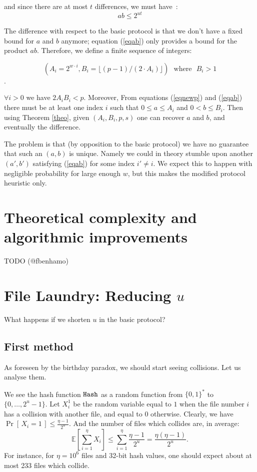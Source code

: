 \documentclass[11pt]{llncs}
\newcommand{\Prob}[1]{{\Pr\left[\,{#1}\,\right]}}
\newcommand{\EE}[1]{{\mathbb{E}\left[{#1}\right]}}
\begin{document}
and since there are at most $t$ differences, we must have~:
\begin{equation}
\label{eqab}
a b \leq 2^{ut}
\end{equation}

The difference with respect to the basic protocol is that we don't have a fixed bound for $a$ and $b$ anymore; equation (\ref{eqab}) only provides a bound for the product $a b$. Therefore, we define a finite sequence of integers:

$$(A_i=2^{w \cdot i},B_i=\lfloor (p-1)/(2 \cdot A_i) \rfloor)\mbox{~~where~~}B_i>1$$. 

$\forall i>0$ we have $2 A_i B_i<p$. Moreover, From equations (\ref{eqnewp}) and (\ref{eqab}) there must be at least one index $i$ such that $0 \leq a \leq A_i$ and $0 <b \leq B_i$. Then using Theorem \ref{theo}, given $(A_i,B_i,p,s)$ one can recover $a$ and $b$, and eventually the difference.\smallskip
 
The problem is that (by opposition to the basic protocol) we have no guarantee that such an $(a,b)$ is unique. Namely we could in theory stumble upon another $(a',b')$ satisfying (\ref{eqab}) for some index $i' \neq i$. We expect this to happen with negligible probability for large enough $w$, but this makes the modified protocol heuristic only.

\section{Theoretical complexity and algorithmic improvements}

TODO (@fbenhamo)

\section{File Laundry: Reducing $u$}

What happens if we shorten $u$ in the basic protocol?\smallskip

\subsection{First method}

As foreseen by the birthday paradox, we should start seeing collisions.
Let us analyse them.

We see the hash function $\mbox{{\tt Hash}}$ as a random function from $\{0,1\}^*$ to $\{0,\dots,2^u-1\}$.
Let $X^1_i$ be the random variable equal to $1$ when the file number $i$ has a collision with another file, and equal to $0$ otherwise.
Clearly, we have $\Prob{X_i = 1} \le \frac{\eta -1}{2^u}$.
And the number of files which collides are, in average:
\[ \EE{\sum_{i=1}^{\eta} X_i} \le \sum_{i=1}^\eta \frac{\eta -1}{2^u} = \frac{\eta (\eta - 1)}{2^u}. \]
For instance, for $\eta=10^6$ files and 32-bit hash values, one should expect about at most 233 files which collide.\smallskip
\end{document}
